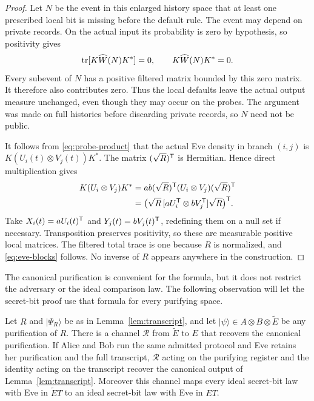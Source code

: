 \begin{proof}
Let $N$ be the event in this enlarged history space that at least one
prescribed local bit is missing before the default rule.  The event may
depend on private records.  On the actual input its probability is
zero by hypothesis, so positivity gives
\[
 \operatorname{tr}[K\widehat W(N)K^*]=0,
 \qquad K\widehat W(N)K^*=0.
\]
Every subevent of $N$ has a positive filtered matrix bounded by this
zero matrix.  It therefore also contributes zero.  Thus the local
defaults leave the actual output measure unchanged, even though they
may occur on the probes.  The argument was made on full histories
before discarding private records, so $N$ need not be public.

It follows from \eqref{eq:probe-product} that the actual Eve density
in branch $(i,j)$ is $K(U_i(t)\otimes V_j(t))K^*$.  The matrix
$(\sqrt R)^\mathsf T$ is Hermitian.  Hence direct multiplication gives
\[
 \begin{aligned}
 K(U_i\otimes V_j)K^*
 &=ab(\sqrt R)^\mathsf T(U_i\otimes V_j)(\sqrt R)^\mathsf T\\
 &=\bigl(\sqrt R\,[aU_i^\mathsf T\otimes bV_j^\mathsf T]\sqrt R\bigr)^\mathsf T.
 \end{aligned}
\]
Take $X_i(t)=aU_i(t)^\mathsf T$ and $Y_j(t)=bV_j(t)^\mathsf T$, redefining them on a
null set if necessary.  Transposition preserves positivity, so these
are measurable positive local matrices.  The filtered total trace is
one because $R$ is normalized, and \eqref{eq:eve-blocks} follows.
No inverse of $R$ appears anywhere in the construction.
\end{proof}

The canonical purification is convenient for the formula, but it does
not restrict the adversary or the ideal comparison law.  The following
observation will let the secret-bit proof use that formula for every
purifying space.

\begin{lemma}
\label{lem:purification-recovery}
Let $R$ and $|\Psi_R\rangle$ be as in Lemma~\ref{lem:transcript}, and
let $|\psi\rangle\in A\otimes B\otimes\widetilde E$ be any purification
of $R$.  There is a channel $\mathcal R$ from $\widetilde E$ to $E$
that recovers the canonical purification.  If Alice and Bob run the
same admitted protocol and Eve retains her purification and the full
transcript, $\mathcal R$ acting on the purifying register and the
identity acting on the transcript recover the canonical output of
Lemma~\ref{lem:transcript}.  Moreover this channel maps every ideal
secret-bit law with Eve in $\widetilde E T$ to an ideal secret-bit law
with Eve in $ET$.
\end{lemma}

